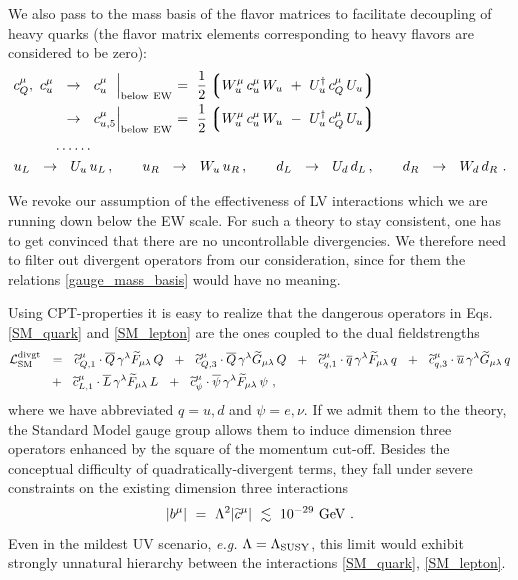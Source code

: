 \documentclass[12pt]{revtex4}
\newcommand{\wt}{\widetilde}
\newcommand{\ov}{\overline}
\begin{document}
	We also pass to the mass basis of the flavor matrices to facilitate
	decoupling of heavy quarks (the flavor matrix elements corresponding
	to heavy flavors are considered to be zero):
\begin{align}
\label{gauge_mass_basis}
\notag
	c_Q^\mu,\  c_u^\mu  & ~~\rightarrow~~ c_{u\phantom{,5}}^\mu 
				\Bigl|_{\rm below\ EW}  ~=~ \frac{1}{2} 
			\left\lgroup W^\mu_u\, c_u^\mu\, W_u ~+~ U_u^\dag\, c_Q^\mu\, U_u 
						\right\rgroup
	\\
	&
	~~\rightarrow~~ c_{u,5}^\mu 
			\Bigl|_{\rm below\ EW}  ~=~ \frac{1}{2} 
			\left\lgroup W^\mu_u\, c_u^\mu\, W_u ~-~ U_u^\dag\, c_Q^\mu\, U_u 
						\right\rgroup
	\\
\notag
	& \dots\dots
	\\
\notag
	& 
	\hspace{-1.0cm}
	u_L ~~\rightarrow~~ U_u\, u_L\,,   \qquad u_R ~~\rightarrow~~ W_u\, u_R\,, \qquad 
	d_L ~~\rightarrow~~ U_d\, d_L\,,   \qquad d_R ~~\rightarrow~~ W_d\, d_R~.
\end{align}

	We revoke our assumption of the effectiveness of LV interactions 
	which we are running down below the EW scale.
	For such a theory to stay consistent, one has to get convinced that
	there are no uncontrollable divergencies.
	We therefore need to filter out divergent operators from our consideration,
	since for them the relations \eqref{gauge_mass_basis} would have no
	meaning.

	Using CPT-properties it is easy to realize that the dangerous operators
	in Eqs. \eqref{SM_quark} and \eqref{SM_lepton} are the ones coupled to
	the dual fieldstrengths
\begin{align}
\notag
	\mathcal{L}_{\rm SM}^{\rm divgt} & ~~=~~
	\wt{c}_{Q,1}^\mu \cdot
	\ov{Q}\, \gamma^\lambda \wt{F}_{\mu\lambda}\, Q 
	~~+~~
	\wt{c}_{Q,3}^\mu \cdot
	\ov{Q}\, \gamma^\lambda \wt{G}_{\mu\lambda}\, Q 
	~~+~~
	\wt{c}_{q,1}^\mu \cdot
	\ov{q}\, \gamma^\lambda \wt{F}_{\mu\lambda}\, q
	~~+~~ 
	\wt{c}_{q,3}^\mu \cdot
	\ov{u}\, \gamma^\lambda \wt{G}_{\mu\lambda}\, q
	\\
	&
	~~+~~ 
	\wt{c}_{L,1}^\mu \cdot
	\ov{L}\, \gamma^{\lambda} \wt{F}_{\mu\lambda}\, L
	~~+~~
	\wt{c}_{\psi}^\mu \cdot
	\ov{\psi}\, \gamma^{\lambda} \wt{F}_{\mu\lambda}\, \psi
	~,
\end{align}
	where we have abbreviated $ q = u, d $ and $ \psi = e, \nu $.
	If we admit them to the theory, the Standard Model gauge group
	allows them to induce dimension three operators enhanced by the
	square of the momentum cut-off. 
	Besides the conceptual difficulty of quadratically-divergent terms,
	they fall under severe constraints on the existing dimension three
	interactions
\[
	| b^\mu | ~=~ \Lambda^2 | \wt{c}^\mu |  ~\lesssim~ 10^{-29}~{\rm GeV}~.
\]
	Even in the mildest UV scenario, {\it e.g.} $ \Lambda = \Lambda_{\rm SUSY} $,
	this limit would exhibit strongly unnatural hierarchy between the interactions
	\eqref{SM_quark}, \eqref{SM_lepton}. 
	
\end{document}
